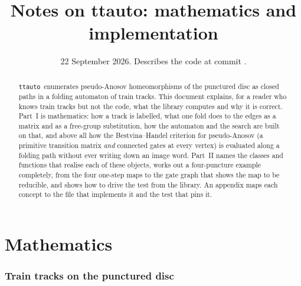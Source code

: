 \documentclass[12pt]{amsart}
\title[Notes on ttauto]{Notes on ttauto: mathematics and
  implementation}
\date{22 September 2026.  Describes the code at commit \code{ae62bfd}.}
\newcommand{\ttauto}{\texttt{ttauto}}
\theoremstyle{plain}
\theoremstyle{definition}
\begin{document}
\begin{abstract}
  \ttauto\ enumerates pseudo-Anosov homeomorphisms of the punctured disc
  as closed paths in a folding automaton of train tracks.  This document
  explains, for a reader who knows train tracks but not the code, what
  the library computes and why it is correct.  Part~I is mathematics: how
  a track is labelled, what one fold does to the edges as a matrix and as
  a free-group substitution, how the automaton and the search are built
  on that, and above all how the Bestvina--Handel criterion for
  pseudo-Anosov (a primitive transition matrix \emph{and} connected gates
  at every vertex) is evaluated along a folding path without ever writing
  down an image word.  Part~II names the classes and functions that
  realise each of these objects, works out a four-puncture example
  completely, from the four one-step maps to the gate graph that shows
  the map to be reducible, and shows how to drive the test from the
  library.  An appendix maps each concept to the file that implements it
  and the test that pins it.
\end{abstract}

\maketitle
\tableofcontents

\part{Mathematics}

\section{Train tracks on the punctured disc}
\label{sec:tracks}
\end{document}
